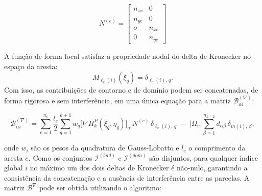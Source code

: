     \begin{equation}
        N^{(e)} = \begin{bmatrix} n_{xe} & 0 \\ n_{ye} & 0 \\ o & n_{xe} \\ 0 & n_{ye} \end{bmatrix}
    \end{equation}
    
    \indent A função de forma local satisfaz a propriedade nodal do delta de Kronecker no espaço da aresta: $$M_{\ell_e(i)}(\xi_q) = \delta_{\ell_e(i),\,q}.$$ Com isso, as contribuições de contorno e de domínio podem ser concatenadas, de forma rigorosa e sem interferência, em uma única equação para a matriz $\mathcal{B}_{\alpha i}^{(\nabla)}$:
    
    \begin{equation}
        \mathcal{B}^{(\nabla)}_{\alpha i} = \sum_{e=1}^{n_e}\frac{l_e}{2}\sum_{q=1}^{k+1}w_q
        \bigl[\nabla H_k^P(\xi_q,\eta_q)\bigr]_{\alpha}\,N^{(e)}\, \delta_{\ell_e(i),\,q} \;-\; |\Omega_v|\sum_{\beta=1}^{n_{k-2}}d_{\alpha\beta}\,\delta_{m(i),\,\beta},
        \label{eq:4.29}
    \end{equation}

    \noindent onde $w_i$ são os pesos da quadratura de Gauss-Lobatto e $l_e$ o comprimento da aresta $e$.
    \indent Como os conjuntos $\mathcal{I}^{(bnd)}$ e $\mathcal{I}^{(dom)}$ são disjuntos, para qualquer índice global $i$ no máximo um dos dois deltas de Kronecker é não-nulo, garantindo a consistência da concatenação e a ausência de interferência entre as parcelas. A matriz $\mathcal{B}^{\nabla}$ pode ser obtida utilizando o algoritmo:

    \vspace{5mm}

